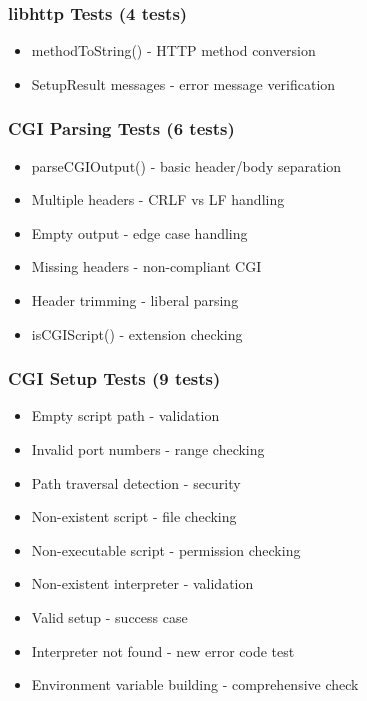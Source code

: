 \documentclass[11pt,a4paper]{article}
\begin{document}
\subsubsection{libhttp Tests (4 tests)}

\begin{itemize}
    \item methodToString() - HTTP method conversion
    \item SetupResult messages - error message verification
\end{itemize}

\subsubsection{CGI Parsing Tests (6 tests)}

\begin{itemize}
    \item parseCGIOutput() - basic header/body separation
    \item Multiple headers - CRLF vs LF handling
    \item Empty output - edge case handling
    \item Missing headers - non-compliant CGI
    \item Header trimming - liberal parsing
    \item isCGIScript() - extension checking
\end{itemize}

\subsubsection{CGI Setup Tests (9 tests)}

\begin{itemize}
    \item Empty script path - validation
    \item Invalid port numbers - range checking
    \item Path traversal detection - security
    \item Non-existent script - file checking
    \item Non-executable script - permission checking
    \item Non-existent interpreter - validation
    \item Valid setup - success case
    \item Interpreter not found - new error code test
    \item Environment variable building - comprehensive check
\end{itemize}
\end{document}

